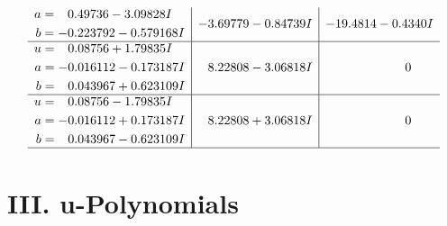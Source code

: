 \documentclass[1p]{elsarticle_modified}
\theoremstyle{definition}
\begin{document}
$$\begin{array}{c|c|c}
\begin{aligned}
a &= \phantom{-}0.49736 - 3.09828 I \\
b &= -0.223792 - 0.579168 I\end{aligned}
 & -3.69779 - 0.84739 I & -19.4814 - 0.4340 I \\ \hline\begin{aligned}
u &= \phantom{-}0.08756 + 1.79835 I \\
a &= -0.016112 - 0.173187 I \\
b &= \phantom{-}0.043967 + 0.623109 I\end{aligned}
 & \phantom{-}8.22808 - 3.06818 I & \phantom{-0.000000 } 0 \\ \hline\begin{aligned}
u &= \phantom{-}0.08756 - 1.79835 I \\
a &= -0.016112 + 0.173187 I \\
b &= \phantom{-}0.043967 - 0.623109 I\end{aligned}
 & \phantom{-}8.22808 + 3.06818 I & \phantom{-0.000000 } 0\\
 \hline 
 \end{array}$$\newpage
\newpage\renewcommand{\arraystretch}{1}
\centering \section*{ III. u-Polynomials}
\end{document}
